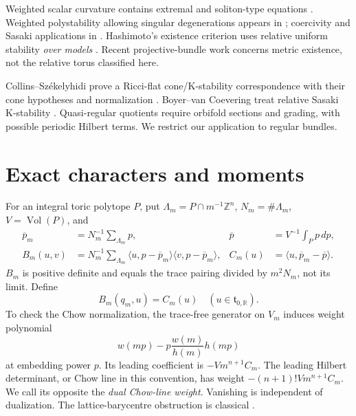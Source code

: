 \documentclass[12pt]{amsart}
\theoremstyle{definition}
\theoremstyle{remark}
\numberwithin{equation}{section}
\DeclareMathOperator{\Vol}{Vol}
\newcommand{\R}{\mathbb{R}}
\newcommand{\Z}{\mathbb{Z}}
\begin{document}
Weighted scalar curvature contains extremal and soliton-type equations \cite{en-Lah}. Weighted polystability allowing singular degenerations appears in \cite{en-Hal23}; coercivity and Sasaki applications in \cite{en-AJL}. Hashimoto's existence criterion uses relative uniform stability \emph{over models} \cite[Theorem 1.1]{en-Has25}. Recent projective-bundle work \cite{en-Jub26} concerns metric existence, not the relative torus classified here.

Collins--Sz\'ekelyhidi prove a Ricci-flat cone/K-stability correspondence with their cone hypotheses and normalization \cite{en-CS}. Boyer--van Coevering treat relative Sasaki K-stability \cite{en-BvC}. Quasi-regular quotients require orbifold sections and grading, with possible periodic Hilbert terms. We restrict our application to regular bundles.

\section{Exact characters and moments}
For an integral toric polytope $P$, put $\Lambda_m=P\cap m^{-1}\Z^n$, $N_m=\#\Lambda_m$, $V=\Vol(P)$, and
\begin{align}\label{en-means}
\overline p_m&=N_m^{-1}\sum_{\Lambda_m}p,&
\overline p&=V^{-1}\int_Pp\,dp,\\
B_m(u,v)&=N_m^{-1}\sum_{\Lambda_m}
\langle u,p-\overline p_m\rangle\langle v,p-\overline p_m\rangle,&
C_m(u)&=\langle u,\overline p_m-\overline p\rangle.\label{en-char}
\end{align}
$B_m$ is positive definite and equals the trace pairing divided by $m^2N_m$, not its limit. Define
\begin{equation}\label{en-dual}
B_m(q_m,u)=C_m(u)\quad(u\in\mathfrak t_{0,\R}).
\end{equation}
To check the Chow normalization, the trace-free generator on $V_m$ induces weight polynomial
\[
w(mp)-p\frac{w(m)}{h(m)}h(mp)
\]
at embedding power $p$. Its leading coefficient is $-Vm^{n+1}C_m$. The leading Hilbert determinant, or Chow line in this convention, has weight $-(n+1)!Vm^{n+1}C_m$. We call its opposite the \emph{dual Chow-line weight}. Vanishing is independent of dualization. The lattice-barycentre obstruction is classical \cite{en-YZ,en-LY26}.
\end{document}
